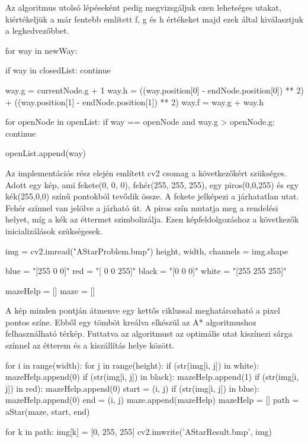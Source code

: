Az algoritmus utolsó lépéseként pedig megvizsgáljuk ezen lehetséges utakat, kiértékeljük a már fentebb említett f, g és h értékeket majd ezek által kiválasztjuk a legkedvezőbbet.
\begin{python}
for way in newWay:

    if way in closedList:
        continue

    way.g = currentNode.g + 1
    way.h = ((way.position[0] - endNode.position[0]) ** 2) + ((way.position[1] - endNode.position[1]) ** 2)
    way.f = way.g + way.h

    for openNode in openList:
        if way == openNode and way.g > openNode.g:
            continue

    openList.append(way)
\end{python}

Az implementációs rész elején említett cv2 csomag a következőkért szükséges. Adott egy kép, ami fekete(0, 0, 0), fehér(255, 255, 255), egy piros(0,0,255) és egy kék(255,0,0) színű pontokból tevődik össze. A fekete jelképezi a járhatatlan utat. Fehér színnel van jelölve a járható út. A piros szín mutatja meg a rendelési helyet, míg a kék az éttermet szimbolizálja. Ezen képfeldolgozáshoz a következők inicializálások szükségesek.

\begin{python}
img = cv2.imread("AStarProblem.bmp")
height, width, channels = img.shape

blue = "[255   0   0]"
red = "[  0   0 255]"
black = "[0 0 0]"
white = "[255 255 255]"
    
mazeHelp = []
maze = []
\end{python}

A kép minden pontján átmenve egy kettős ciklussal meghatározható a pixel pontos színe. Ebből egy tömböt kreálva elkészül az A* algoritmushoz felhasználható térkép. Futtatva az algoritmust az optimális utat kiszínezi sárga színnel az étterem és a kiszállítás helye között.

\begin{python}
for i in range(width):
    for j in range(height):
        if (str(img[i, j]) in white):
            mazeHelp.append(0)
        if (str(img[i, j]) in black):
            mazeHelp.append(1)
        if (str(img[i, j]) in red):
            mazeHelp.append(0)
            start = (i, j)
        if (str(img[i, j]) in blue):
            mazeHelp.append(0)
            end = (i, j)
    maze.append(mazeHelp)
    mazeHelp = []
path = aStar(maze, start, end)

for k in path:
    img[k] = [0, 255, 255]
cv2.imwrite('AStarResult.bmp', img)
\end{python}

